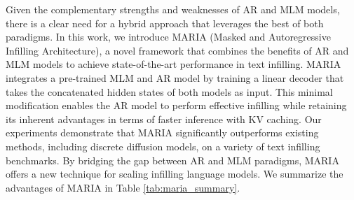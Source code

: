 Given the complementary strengths and weaknesses of AR and MLM models, there is a clear need for a hybrid approach that leverages the best of both paradigms. In this work, we introduce MARIA (Masked and Autoregressive Infilling Architecture), a novel framework that combines the benefits of AR and MLM models to achieve state-of-the-art performance in text infilling. MARIA integrates a pre-trained MLM and AR model by training a linear decoder that takes the concatenated hidden states of both models as input. This minimal modification enables the AR model to perform effective infilling while retaining its inherent advantages in terms of faster inference with KV caching. Our experiments demonstrate that MARIA significantly outperforms existing methods, including discrete diffusion models, on a variety of text infilling benchmarks. By bridging the gap between AR and MLM paradigms, MARIA offers a new technique for scaling infilling language models. We summarize the advantages of MARIA in Table \ref{tab:maria_summary}.
